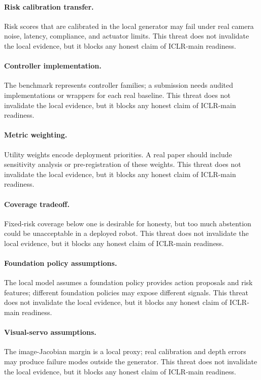 \documentclass{article}
\begin{document}
\paragraph{Risk calibration transfer.} Risk scores that are calibrated in the local generator may fail under real camera noise, latency, compliance, and actuator limits. This threat does not invalidate the local evidence, but it blocks any honest claim of ICLR-main readiness.
\paragraph{Controller implementation.} The benchmark represents controller families; a submission needs audited implementations or wrappers for each real baseline. This threat does not invalidate the local evidence, but it blocks any honest claim of ICLR-main readiness.
\paragraph{Metric weighting.} Utility weights encode deployment priorities. A real paper should include sensitivity analysis or pre-registration of these weights. This threat does not invalidate the local evidence, but it blocks any honest claim of ICLR-main readiness.
\paragraph{Coverage tradeoff.} Fixed-risk coverage below one is desirable for honesty, but too much abstention could be unacceptable in a deployed robot. This threat does not invalidate the local evidence, but it blocks any honest claim of ICLR-main readiness.
\paragraph{Foundation policy assumptions.} The local model assumes a foundation policy provides action proposals and risk features; different foundation policies may expose different signals. This threat does not invalidate the local evidence, but it blocks any honest claim of ICLR-main readiness.
\paragraph{Visual-servo assumptions.} The image-Jacobian margin is a local proxy; real calibration and depth errors may produce failure modes outside the generator. This threat does not invalidate the local evidence, but it blocks any honest claim of ICLR-main readiness.
\end{document}
